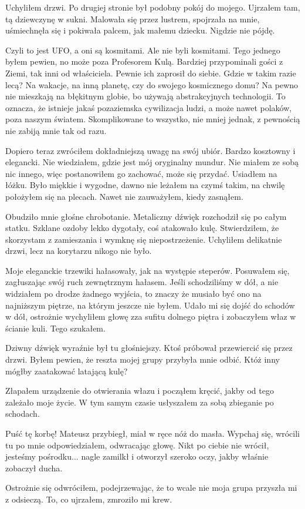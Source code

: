 Uchyliłem drzwi. Po drugiej stronie był podobny pokój do mojego.
Ujrzałem tam, tą dziewczynę w sukni.
Malowała się przez lustrem, spojrzała na mnie, uśmiechnęła się i pokiwała palcem, jak małemu dziecku.
Nigdzie nie pójdę.

Czyli to jest UFO, a oni są kosmitami.
Ale nie byli kosmitami. Tego jednego byłem pewien, no może poza Profesorem Kulą.
Bardziej przypominali gości z Ziemi, tak inni od właściciela. Pewnie ich zaprosił do siebie.
Gdzie w takim razie lecą?
Na wakacje, na inną planetę, czy do swojego kosmicznego domu?
Na pewno nie mieszkają na błękitnym globie, bo używają abstrakcyjnych technologii.
To oznacza, że istnieje jakaś pozaziemska cywilizacja ludzi, a może nawet polaków, poza naszym światem.
Skomplikowane to wszystko, nie mniej jednak, z pewnością nie zabiją mnie tak od razu.

Dopiero teraz zwróciłem dokładniejszą uwagę na swój ubiór.
Bardzo kosztowny i elegancki. Nie wiedziałem, gdzie jest mój oryginalny mundur. 
Nie miałem ze sobą nic innego, więc postanowiłem go zachować, może się przydać.
Usiadłem na łóżku. Było miękkie i wygodne, dawno nie leżałem na czymś takim, na chwilę położyłem się na plecach.
Nawet nie zauważyłem, kiedy zasnąłem.

Obudziło mnie głośne chrobotanie. Metaliczny dźwięk rozchodził się po całym statku.
Szklane ozdoby lekko dygotały, coś atakowało kulę.
Stwierdziłem, że skorzystam z zamieszania i wymknę się niepostrzeżenie.
Uchyliłem delikatnie drzwi, lecz na korytarzu nikogo nie było.

Moje eleganckie trzewiki hałasowały, jak na występie steperów.
Posuwałem się, zagłuszając swój ruch zewnętrznym hałasem.
Jeśli schodziliśmy w dół, a nie widziałem po drodze żadnego wyjścia, to znaczy że musiało być ono na najniższym piętrze, na którym jeszcze nie byłem.
Udało mi się dojść do schodów w dół, ostrożnie wychyliłem głowę zza sufitu dolnego piętra i zobaczyłem właz w ścianie kuli.
Tego szukałem.

Dziwny dźwięk wyraźnie był tu głośniejszy. Ktoś próbował przewiercić się przez drzwi.
Byłem pewien, że reszta mojej grupy przybyła mnie odbić.
Któż inny mógłby zaatakować latającą kulę?

Złapałem urządzenie do otwierania włazu i począłem kręcić, jakby od tego zależało moje życie.
W tym samym czasie usłyszałem za sobą zbieganie po schodach.
\begin{dialogue}
\ds{} Puść tę korbę! \dm{} Mateusz przybiegł, miał w ręce nóż do masła.
\ds{} Wypchaj się, wrócili tu po mnie \dm{} odpowiedziałem, odwracając głowę.
\ds{} Nikt po ciebie nie wrócił, jesteśmy pośrodku... \dm{} nagle zamilkł i otworzył szeroko oczy, jakby właśnie zobaczył ducha.
\end{dialogue}
Ostrożnie się odwróciłem, podejrzewając, że to wcale nie moja grupa przyszła mi z odsieczą.
To, co ujrzałem, zmroziło mi krew.

